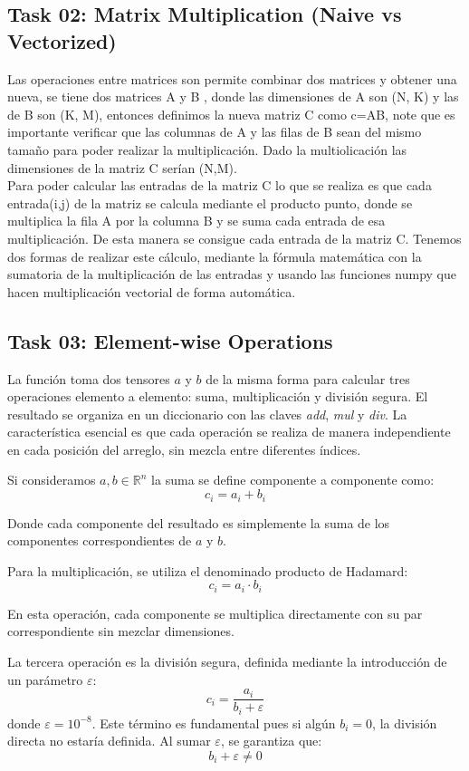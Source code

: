 ﻿\documentclass[12pt]{article}
\begin{document}
\subsection*{Task 02: Matrix Multiplication (Naive vs Vectorized)}
Las operaciones entre matrices son permite combinar dos matrices y obtener una nueva, se tiene dos matrices A
 y B , donde las dimensiones de A son (N, K) y las de B son (K, M), entonces definimos la nueva
  matriz C como c=AB, note que es importante verificar que las columnas de A y las filas de B sean del mismo tamaño
  para poder realizar la multiplicación. Dado la multiolicación las dimensiones de la matriz C serían (N,M).\\
Para poder calcular las entradas de la matriz C lo que se realiza es que cada entrada(i,j) de la matriz se calcula
 mediante el producto punto, donde se multiplica la fila A por la columna B y se suma cada entrada de esa multiplicación.
 De esta manera se consigue cada entrada de la matriz C. Tenemos dos formas de realizar este cálculo, mediante
  la fórmula matemática con la sumatoria de la multiplicación de las entradas y usando las funciones numpy
   que hacen multiplicación vectorial de forma automática.
\subsection*{Task 03: Element-wise Operations}

La función  toma dos tensores $a$ y $b$ de la misma forma para calcular tres operaciones elemento a elemento: suma, multiplicación y división segura. El resultado se organiza en un diccionario con las claves \textit{add}, \textit{mul} y \textit{div}. La característica esencial es que cada operación se realiza de manera independiente en cada posición del arreglo, sin mezcla entre diferentes índices.


Si consideramos $a, b \in \mathbb{R}^n$  la suma se define componente a componente como:
$$
    c_i = a_i + b_i
$$

Donde cada componente del resultado es simplemente la suma de los componentes correspondientes de $a$ y $b$.

Para la multiplicación, se utiliza el denominado producto de Hadamard:
$$
    c_i = a_i \cdot b_i 
$$

En esta operación, cada componente se multiplica directamente con su par correspondiente sin mezclar dimensiones. 

La tercera operación es la división segura, definida mediante la introducción de un parámetro $\varepsilon$:
$$    c_i = \frac{a_i}{b_i + \varepsilon}$$
donde $\varepsilon = 10^{-8}$. Este término es fundamental pues si algún $b_i = 0$, la división directa no estaría definida. Al sumar $\varepsilon$, se garantiza que:
$$
    b_i + \varepsilon \neq 0
$$
\end{document}
